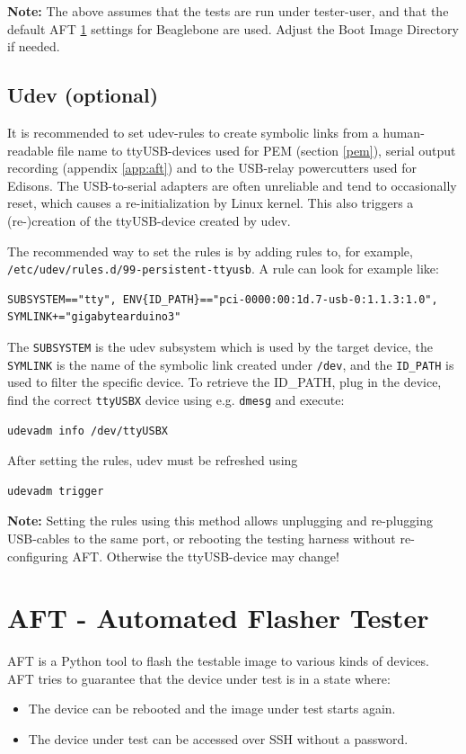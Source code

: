 \documentclass[a4paper,11pt]{article}
\newcommand{\note}{\textbf{Note: }}
\newcommand{\cmd}[1]{\texttt{#1}}
\begin{document}
\note The above assumes that the tests are run under tester-user, and that the default AFT \ref{aft} settings for Beaglebone are used. Adjust the Boot Image Directory if needed.

\subsection*{Udev (optional)}
It is recommended to set udev-rules to create symbolic links from a human-readable file name to ttyUSB-devices used for PEM (section \ref{pem}), serial output recording (appendix \ref{app:aft}) and to the USB-relay powercutters used for Edisons. The USB-to-serial adapters are often unreliable and tend to occasionally reset, which causes a re-initialization by Linux kernel. This also triggers a (re-)creation of the ttyUSB-device created by udev.

The recommended way to set the rules is by adding rules to, for example, \\ \cmd{/etc/udev/rules.d/99-persistent-ttyusb}. A rule can look for example like:
\begin{lstlisting}
SUBSYSTEM=="tty", ENV{ID_PATH}=="pci-0000:00:1d.7-usb-0:1.1.3:1.0", SYMLINK+="gigabytearduino3"
\end{lstlisting}
The \cmd{SUBSYSTEM} is the udev subsystem which is used by the target device, the \cmd{SYMLINK} is the name of the symbolic link created under \cmd{/dev}, and the \cmd{ID\_PATH} is used to filter the specific device. To retrieve the {ID\_PATH}, plug in the device, find the correct \cmd{ttyUSBX} device using e.g. \cmd{dmesg} and execute:
\begin{lstlisting}
udevadm info /dev/ttyUSBX
\end{lstlisting}

After setting the rules, udev must be refreshed using
\begin{lstlisting}
udevadm trigger
\end{lstlisting}

\note Setting the rules using this method allows unplugging and re-plugging USB-cables to the same port, or rebooting the testing harness without re-configuring AFT. Otherwise the ttyUSB-device may change!

\section{AFT - Automated Flasher Tester}
\label{aft}

AFT is a Python tool to flash the testable image to various kinds of devices.  AFT tries to guarantee that the device under test is in a state where:
\begin{itemize}
\item The device can be rebooted and the image under test starts again.
\item The device under test can be accessed over SSH without a password.
\end{itemize}
\end{document}
